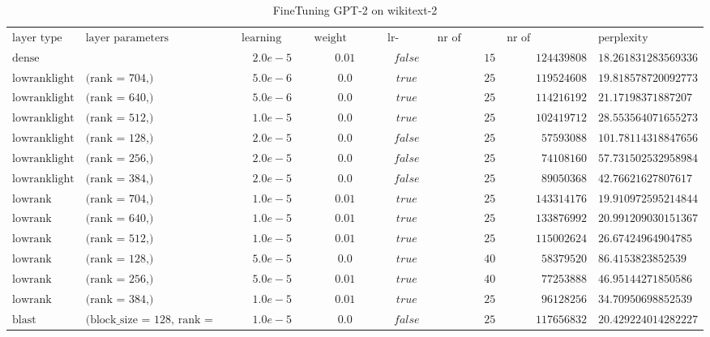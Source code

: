 \begin{sidewaystable}[h!]
\centering
\tiny
\caption{FineTuning GPT-2 on wikitext-2}
\label{tab:ft_results}
\begin{tabular}{llcccrrl}
$\text{layer type}$ & $\text{layer parameters}$ & $\text{learning rate}$ & $\text{weight decay}$ & $\text{lr-decay}$ & $\text{nr of epochs}$ & $\text{nr of parameters}$ & $\text{perplexity}$\\
$\text{dense}$ & $\text{}$ & $2.0e-5$ & $0.01$ & $false$ & $15$ & $124439808$ & $18.261831283569336$\\
$\text{lowranklight}$ & $\text{(rank = 704,)}$ & $5.0e-6$ & $0.0$ & $true$ & $25$ & $119524608$ & $19.818578720092773$\\
$\text{lowranklight}$ & $\text{(rank = 640,)}$ & $5.0e-6$ & $0.0$ & $true$ & $25$ & $114216192$ & $21.17198371887207$\\
$\text{lowranklight}$ & $\text{(rank = 512,)}$ & $1.0e-5$ & $0.0$ & $true$ & $25$ & $102419712$ & $28.553564071655273$\\
$\text{lowranklight}$ & $\text{(rank = 128,)}$ & $2.0e-5$ & $0.0$ & $false$ & $25$ & $57593088$ & $101.78114318847656$\\
$\text{lowranklight}$ & $\text{(rank = 256,)}$ & $2.0e-5$ & $0.0$ & $false$ & $25$ & $74108160$ & $57.731502532958984$\\
$\text{lowranklight}$ & $\text{(rank = 384,)}$ & $2.0e-5$ & $0.0$ & $false$ & $25$ & $89050368$ & $42.76621627807617$\\
$\text{lowrank}$ & $\text{(rank = 704,)}$ & $1.0e-5$ & $0.01$ & $true$ & $25$ & $143314176$ & $19.910972595214844$\\
$\text{lowrank}$ & $\text{(rank = 640,)}$ & $1.0e-5$ & $0.01$ & $true$ & $25$ & $133876992$ & $20.991209030151367$\\
$\text{lowrank}$ & $\text{(rank = 512,)}$ & $1.0e-5$ & $0.01$ & $true$ & $25$ & $115002624$ & $26.67424964904785$\\
$\text{lowrank}$ & $\text{(rank = 128,)}$ & $5.0e-5$ & $0.0$ & $true$ & $40$ & $58379520$ & $86.4153823852539$\\
$\text{lowrank}$ & $\text{(rank = 256,)}$ & $5.0e-5$ & $0.01$ & $true$ & $40$ & $77253888$ & $46.95144271850586$\\
$\text{lowrank}$ & $\text{(rank = 384,)}$ & $1.0e-5$ & $0.01$ & $true$ & $25$ & $96128256$ & $34.70950698852539$\\
$\text{blast}$ & $\text{(block\_size = 128, rank = 512)}$ & $1.0e-5$ & $0.0$ & $false$ & $25$ & $117656832$ & $20.429224014282227$\\

\end{tabular}
\end{sidewaystable}
